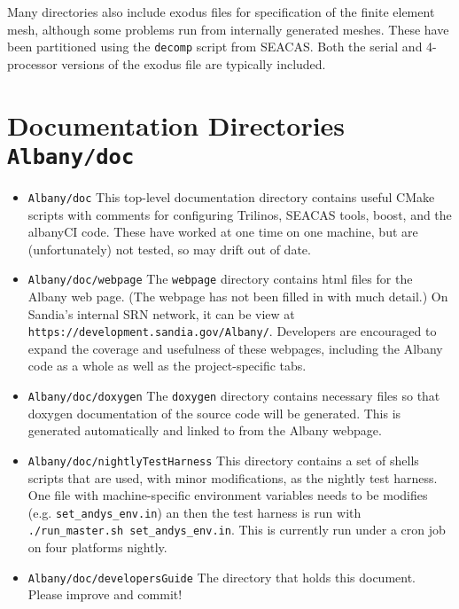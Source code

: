 \documentclass[pdf,12pt,report,strict]{SANDreport}
\theoremstyle{remark}
\begin{document}
Many directories also include exodus files for specification of the finite element mesh,
although some problems run from internally generated meshes. These have been partitioned
using the \texttt{decomp} script from SEACAS. Both the serial and 4-processor versions
of the exodus file are typically included.

\section{Documentation Directories \texttt{Albany/doc} }

\begin{itemize}

\item{\texttt{Albany/doc}}  This top-level documentation directory contains
useful CMake scripts with comments for configuring Trilinos, SEACAS tools,
boost, and the albanyCI code. These have worked at one time on one machine,
but are (unfortunately) not tested, so may drift out of date.

\item{\texttt{Albany/doc/webpage}} The \texttt{webpage} directory contains
html files for the Albany web page. (The webpage has not been filled in with 
much detail.) On Sandia's internal SRN network, it can be view at
\texttt{https://development.sandia.gov/Albany/}. Developers are encouraged
to expand the coverage and usefulness of these webpages, including the
Albany code as a whole as well as the project-specific tabs. 

\item{\texttt{Albany/doc/doxygen}} The \texttt{doxygen} directory contains
necessary files so that doxygen documentation of the source code will be
generated. This is generated automatically and linked to from the Albany
webpage. 

\item{\texttt{Albany/doc/nightlyTestHarness}} This directory contains
a set of shells scripts that are used, with minor modifications, as
the nightly test harness. One file with machine-specific environment
variables needs to be modifies (e.g. \texttt{set\_andys\_env.in}) an then
the test harness is run with \texttt{./run\_master.sh set\_andys\_env.in}.
This is currently run under a cron job on four platforms nightly.

\item{\texttt{Albany/doc/developersGuide}} The directory that holds this
document. Please improve and commit!

\end{itemize}
\end{document}
